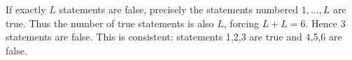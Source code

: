 If exactly $L$ statements are false, precisely the statements numbered $1,\ldots,L$ are true. Thus the number of true statements is also $L$, forcing $L+L=6$. Hence $\boxed3$ statements are false. This is consistent: statements 1,2,3 are true and 4,5,6 are false.
